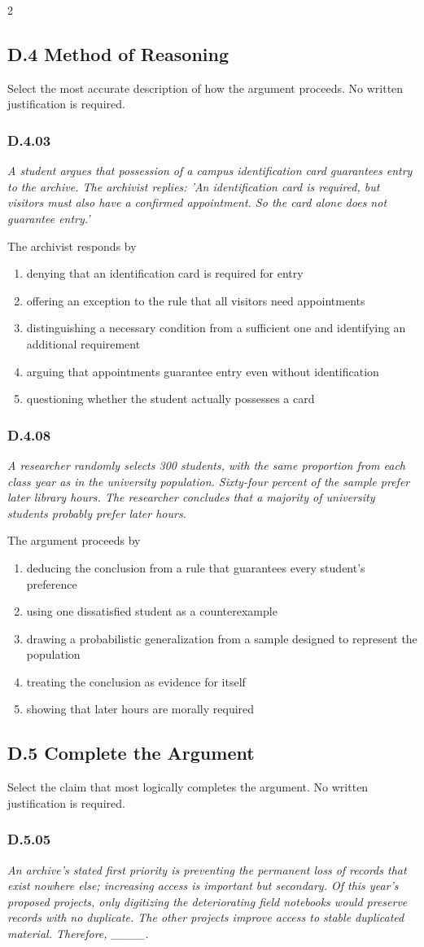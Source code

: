\documentclass[10pt]{extarticle}
\newcommand{\choice}[1]{\item #1}
\newcommand{\bankitem}[1]{\subsubsection*{#1}}
\begin{document}
\begin{multicols}{2}
\subsection*{D.4 Method of Reasoning}
Select the most accurate description of how the argument proceeds. No written justification is required.
\begin{samepage}
\bankitem{D.4.03}
\emph{A student argues that possession of a campus identification card guarantees entry to the archive. The archivist replies: 'An identification card is required, but visitors must also have a confirmed appointment. So the card alone does not guarantee entry.'}

The archivist responds by
\begin{enumerate}[label=(\alph*)]
  \choice{denying that an identification card is required for entry}
  \choice{offering an exception to the rule that all visitors need appointments}
  \choice{distinguishing a necessary condition from a sufficient one and identifying an additional requirement}
  \choice{arguing that appointments guarantee entry even without identification}
  \choice{questioning whether the student actually possesses a card}
\end{enumerate}
\end{samepage}\par\smallskip
\begin{samepage}
\bankitem{D.4.08}
\emph{A researcher randomly selects 300 students, with the same proportion from each class year as in the university population. Sixty-four percent of the sample prefer later library hours. The researcher concludes that a majority of university students probably prefer later hours.}

The argument proceeds by
\begin{enumerate}[label=(\alph*)]
  \choice{deducing the conclusion from a rule that guarantees every student's preference}
  \choice{using one dissatisfied student as a counterexample}
  \choice{drawing a probabilistic generalization from a sample designed to represent the population}
  \choice{treating the conclusion as evidence for itself}
  \choice{showing that later hours are morally required}
\end{enumerate}
\end{samepage}\par\smallskip
\subsection*{D.5 Complete the Argument}
Select the claim that most logically completes the argument. No written justification is required.
\begin{samepage}
\bankitem{D.5.05}
\emph{An archive's stated first priority is preventing the permanent loss of records that exist nowhere else; increasing access is important but secondary. Of this year's proposed projects, only digitizing the deteriorating field notebooks would preserve records with no duplicate. The other projects improve access to stable duplicated material. Therefore, \_\_\_\_.}


\end{samepage}
\end{multicols}
\end{document}
